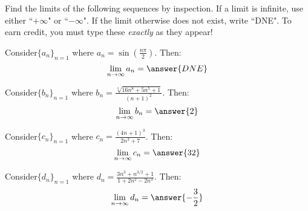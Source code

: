 \documentclass{ximera}
\author{Jim Talamo}
\begin{document}
\begin{exercise}

Find the limits of the following sequences by inspection.  If a limit is infinite, use either ``$+\infty$" or ``$-\infty$".  If the limit otherwise does not exist, write ``DNE".  To earn credit, you must type these \emph{exactly} as they appear!

\begin{exercise}
Consider$\{a_n \}_{n=1}$ where $a_n = \sin\left(\frac{n \pi}{2}\right)$.  Then:
\[
\lim_{n \to \infty} a_n = \answer{DNE}
\]
\end{exercise}

\begin{exercise}
Consider$\{b_n \}_{n=1}$ where $b_n = \frac{\sqrt[4]{16n^8+5n^5+1}}{(n+1)^2}$.  Then:
\[
\lim_{n \to \infty} b_n = \answer{2}
\]
\end{exercise}

\begin{exercise}
Consider$\{c_n \}_{n=1}$ where $c_n = \frac{(4n+1)^3}{2n^3+7}$.  Then:
\[
\lim_{n \to \infty} c_n = \answer{32}
\]
\end{exercise}

\begin{exercise}
Consider$\{d_n \}_{n=1}$ where $d_n = \frac{3n^3+n^{3/2}+1}{1+2n^2-2n^3}$.  Then:
\[
\lim_{n \to \infty} d_n =  \answer{-\frac{3}{2}}
\]
\end{exercise}


\end{exercise}
\end{document}
